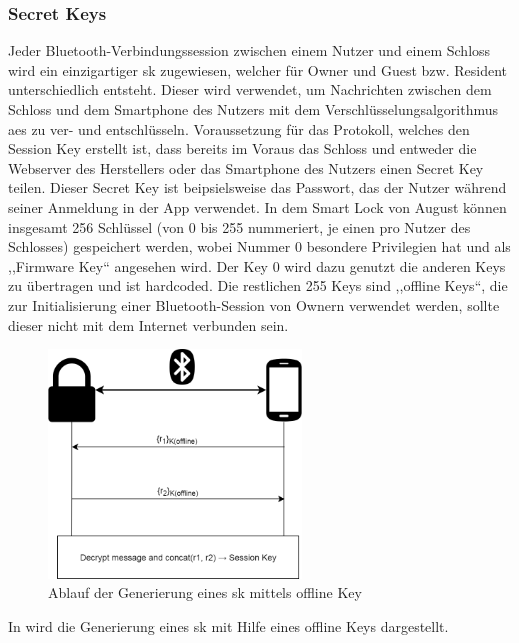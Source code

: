 		\subsubsection*{Secret Keys}
		Jeder Bluetooth-Verbindungssession zwischen einem Nutzer und einem Schloss wird ein einzigartiger \gls{sk} zugewiesen, welcher für Owner und Guest bzw. Resident unterschiedlich entsteht.
		Dieser wird verwendet, um Nachrichten zwischen dem Schloss und dem Smartphone des Nutzers mit dem Verschlüsselungsalgorithmus \gls{aes} zu ver- und entschlüsseln. 
		Voraussetzung für das Protokoll, welches den Session Key erstellt ist, dass bereits im Voraus das Schloss und entweder die Webserver des Herstellers oder das Smartphone des Nutzers einen Secret Key teilen. 
		Dieser Secret Key ist beipsielsweise das Passwort, das der Nutzer während seiner Anmeldung in der App verwendet. 
		In dem Smart Lock von August können insgesamt 256 Schlüssel (von 0 bis 255 nummeriert, je einen pro Nutzer des Schlosses) gespeichert werden, wobei Nummer 0 besondere Privilegien hat und als ,,Firmware Key`` angesehen wird.\cite{Jmaxxz2016,Fuller2017} 
		Der Key 0 wird dazu genutzt die anderen Keys zu übertragen und ist hardcoded. 
        Die restlichen 255 Keys sind ,,offline Keys``, die zur Initialisierung einer Bluetooth-Session von Ownern verwendet werden, sollte dieser nicht mit dem Internet verbunden sein.\cite{Fuller2017}
		\begin{figure}[!htbp]
    		\centering
    		\includegraphics[width=0.6\textwidth]{graphics/owner_key.png}
    		\caption[Generierung eines Session Keys mittels Offline Key]{Ablauf der Generierung eines \gls{sk} mittels offline Key\cite{Fuller2017}}
    		\label{fig:owner_key}
    	\end{figure}
		\newpage
		\indent In  wird die Generierung eines \gls{sk} mit Hilfe eines offline Keys dargestellt.
